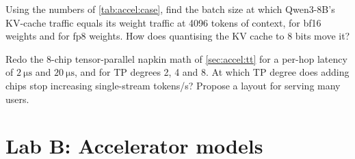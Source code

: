 \begin{exercise}
Using the numbers of \cref{tab:accel:case}, find the batch size at which Qwen3-8B's KV-cache traffic
equals its weight traffic at 4096 tokens of context, for bf16 weights and for fp8 weights. How does
quantising the KV cache to 8 bits move it?
\end{exercise}

\begin{exercise}
Redo the 8-chip tensor-parallel napkin math of \cref{sec:accel:tt} for a per-hop latency of
$\SI{2}{\micro\second}$ and $\SI{20}{\micro\second}$, and for TP degrees 2, 4 and 8. At which TP degree
does adding chips stop increasing single-stream tokens/s? Propose a layout for serving many users.
\end{exercise}

\section{Lab B: Accelerator models}\label{sec:accel:lab}

